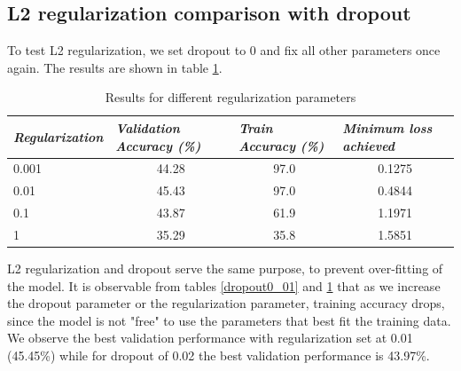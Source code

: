 \documentclass[12pt,twoside]{article}
\begin{document}
\subsection{L2 regularization comparison with dropout}

To test L2 regularization, we set dropout to 0 and fix all other parameters once again. The results are shown in table \ref{regularization}.

\begin{table}[!htbp]
\centering
\begin{tabular}{|l|c|c|c|}
\hline
\textit{\textbf{Regularization}} & \multicolumn{1}{l|}{\textit{\textbf{Validation Accuracy (\%)}}} & \multicolumn{1}{l|}{\textit{\textbf{Train Accuracy (\%)}}} & \multicolumn{1}{l|}{\textit{\textbf{Minimum loss achieved}}} \\ \hline
0.001                            & 44.28                                                           & 97.0                                                       & 0.1275                                                       \\ \hline
0.01                             & 45.43                                                           & 97.0                                                       & 0.4844                                                       \\ \hline
0.1                              & 43.87                                                           & 61.9                                                       & 1.1971                                                       \\ \hline
1                                & 35.29                                                           & 35.8                                                       & 1.5851                                                       \\ \hline
\end{tabular}
\caption{Results for different regularization parameters}
\label{regularization}
\end{table}

L2 regularization and dropout serve the same purpose, to prevent over-fitting of the model. It is observable from tables \ref{dropout0_01} and \ref{regularization} that as we increase the dropout parameter or the regularization parameter, training accuracy drops, since the model is not "free" to use the parameters that best fit the training data. We observe the best validation performance with regularization set at 0.01 (45.45\%) while for dropout of 0.02 the best validation performance is 43.97\%. 
\end{document}
